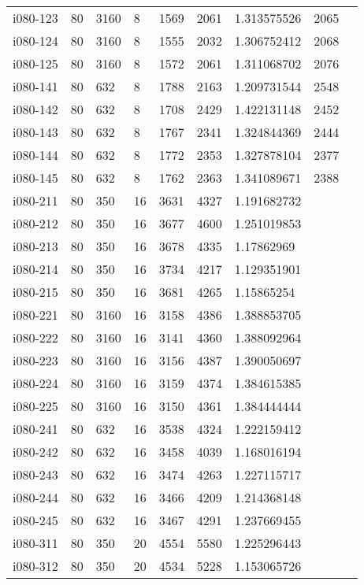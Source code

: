 \begin{appendices}
\begin{longtable}[htbp]{l l l l l l l l l}
 i080-123	&	80 	&	3160 	&	8 	&	1569	&	2061	&	1.313575526	&	2065	\\
 i080-124	&	80 	&	3160 	&	8 	&	1555	&	2032	&	1.306752412	&	2068	\\
 i080-125	&	80 	&	3160 	&	8 	&	1572	&	2061	&	1.311068702	&	2076	\\
\hline
 i080-141	&	80 	&	632 	&	8 	&	1788	&	2163	&	1.209731544	&	2548	\\
 i080-142	&	80 	&	632 	&	8 	&	1708	&	2429	&	1.422131148	&	2452	\\
 i080-143	&	80 	&	632 	&	8 	&	1767	&	2341	&	1.324844369	&	2444	\\
 i080-144	&	80 	&	632 	&	8 	&	1772	&	2353	&	1.327878104	&	2377	\\
 i080-145	&	80 	&	632 	&	8 	&	1762	&	2363	&	1.341089671	&	2388	\\
\hline
 i080-211	&	80 	&	350 	&	16 	&	3631	&	4327	&	1.191682732	&		\\
 i080-212	&	80 	&	350 	&	16 	&	3677	&	4600	&	1.251019853	&		\\
 i080-213	&	80 	&	350 	&	16 	&	3678	&	4335	&	1.17862969	&		\\
 i080-214	&	80 	&	350 	&	16 	&	3734	&	4217	&	1.129351901	&		\\
 i080-215	&	80 	&	350 	&	16 	&	3681	&	4265	&	1.15865254	&		\\
\hline
 i080-221	&	80 	&	3160 	&	16 	&	3158	&	4386	&	1.388853705	&		\\
 i080-222	&	80 	&	3160 	&	16 	&	3141	&	4360	&	1.388092964	&		\\
 i080-223	&	80 	&	3160 	&	16 	&	3156	&	4387	&	1.390050697	&		\\
 i080-224	&	80 	&	3160 	&	16 	&	3159	&	4374	&	1.384615385	&		\\
 i080-225	&	80 	&	3160 	&	16 	&	3150	&	4361	&	1.384444444	&		\\
\hline
 i080-241	&	80 	&	632 	&	16 	&	3538	&	4324	&	1.222159412	&		\\
 i080-242	&	80 	&	632 	&	16 	&	3458	&	4039	&	1.168016194	&		\\
 i080-243	&	80 	&	632 	&	16 	&	3474	&	4263	&	1.227115717	&		\\
 i080-244	&	80 	&	632 	&	16 	&	3466	&	4209	&	1.214368148	&		\\
 i080-245	&	80 	&	632 	&	16 	&	3467	&	4291	&	1.237669455	&		\\
\hline
 i080-311	&	80 	&	350 	&	20 	&	4554	&	5580	&	1.225296443	&		\\
 i080-312	&	80 	&	350 	&	20 	&	4534	&	5228	&	1.153065726	&		\\

\end{longtable}
\end{appendices}
